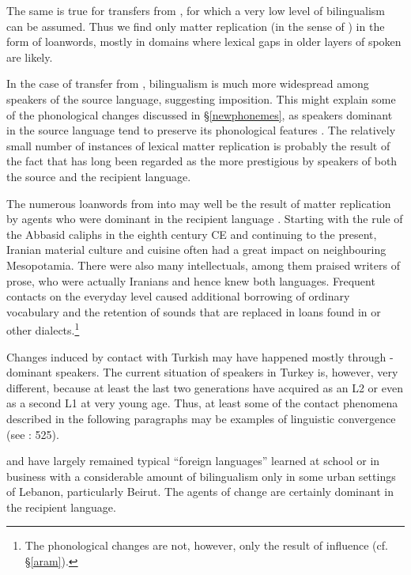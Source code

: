 \documentclass[output=paper]{langsci/langscibook}
\begin{document}
The same is true for transfers from , for which a very low level of {bilingualism} can be assumed. Thus we find only matter {replication} (in the sense of \citealt{Sakel2007}) in the form of {loanwords}, mostly in domains where lexical gaps in older layers of spoken  are likely. 

In the case of transfer from , {bilingualism} is much more widespread among speakers of the {source language}, suggesting {imposition}. This might explain some of the phonological changes discussed in §\ref{newphonemes}, as speakers dominant in the {source language} tend to preserve its phonological features \citep[532]{Lucas2015}. The relatively small number of instances of lexical matter {replication} is probably the result of the fact that  has long been regarded as the more {prestigious} by speakers of both the source and the {recipient language}.

The numerous {loanwords} from  into   may well be the result of matter {replication} by agents who were dominant in the {recipient language} . Starting with the rule of the Abbasid caliphs in the eighth century CE and continuing to the present, Iranian material culture and cuisine often had a great impact on neighbouring Mesopotamia. There were also many intellectuals, among them praised writers of  prose, who were actually Iranians and hence knew both languages. Frequent contacts on the everyday level caused additional borrowing of ordinary vocabulary and the retention of sounds that are replaced in  loans found in  or other dialects.\footnote{The phonological changes are not, however, only the result of  influence (cf. §\ref{aram}).} 

Changes induced by contact with  {Turkish} may have happened most\-ly through -dominant speakers. The current situation of  speakers in Turkey is, however, very different, because at least the last two generations have acquired  as an L2 or even as a second L1 at very young age. Thus, at least some of the contact phenomena described in the following paragraphs may be examples of linguistic {convergence} (see \citealt{Lucas2015}: 525). 

 and  have largely remained typical “foreign languages” learned at school or in business with a considerable amount of {bilingualism} only in some urban settings of Lebanon, particularly Beirut. The agents of change are certainly dominant in the {recipient language}. 
\end{document}
